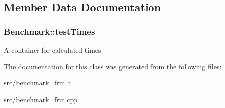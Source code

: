 \subsection{Member Data Documentation}
\hypertarget{class_benchmark_a5563f218941d6b01ac7783f1e6582025}{}
\subsubsection[{test\+Times}]{\setlength{\rightskip}{0pt plus 5cm}Benchmark\+::test\+Times\hspace{0.3cm}{\ttfamily [private]}}\label{class_benchmark_a5563f218941d6b01ac7783f1e6582025}


A container for calculated times. 



The documentation for this class was generated from the following files\+:\begin{DoxyCompactItemize}
\item 
src/\hyperlink{benchmark__frm_8h}{benchmark\+\_\+frm.\+h}\item 
src/\hyperlink{benchmark__frm_8cpp}{benchmark\+\_\+frm.\+cpp}\end{DoxyCompactItemize}
